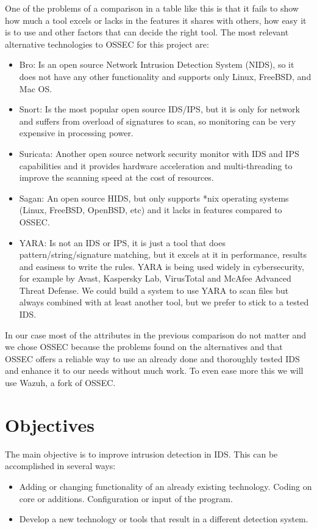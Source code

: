 \linej
\linej
One of the problems of a comparison in a table like this is that it fails to show how much a tool excels or lacks in the features it shares with others, how easy it is to use and other factors that can decide the right tool. The most relevant alternative technologies to OSSEC for this project are\cite{comparison_tools}:
\begin{itemize}
	\item Bro: Is an open source Network Intrusion Detection System (NIDS), so it does not have any other functionality and supports only Linux, FreeBSD, and Mac OS.
	\item Snort: Is the most popular open source IDS/IPS, but it is only for network and suffers from overload of signatures to scan, so monitoring can be very expensive in processing power.
	\item Suricata: Another open source network security monitor with IDS and IPS capabilities and it provides hardware acceleration and multi-threading to improve the scanning speed at the cost of resources.
	\item Sagan: An open source HIDS, but only supports *nix operating systems (Linux, FreeBSD, OpenBSD, etc) and it lacks in features compared to OSSEC.
	\item YARA: Is not an IDS or IPS, it is just a tool that does pattern/string/signature matching, but it excels at it in performance, results and easiness to write the rules. YARA is being used widely in cybersecurity, for example by Avast, Kaspersky Lab, VirusTotal and McAfee Advanced Threat Defense\cite{who_is_using_yara}. We could build a system to use YARA to scan files but always combined with at least another tool, but we prefer to stick to a tested IDS.
\end{itemize}
\linej
In our case most of the attributes in the previous comparison do not matter and we chose OSSEC because the problems found on the alternatives and that OSSEC offers a reliable way to use an already done and thoroughly tested IDS and enhance it to our needs without much work. To even ease more this we will use Wazuh, a fork of OSSEC.





\section{Objectives}
The main objective is to improve intrusion detection in IDS. This can be accomplished in several ways:
\begin{itemize}
	\item Adding or changing functionality of an already existing technology.
		\subitem Coding on core or additions.
		\subitem Configuration or input of the program.
	\item Develop a new technology or tools that result in a different detection system.
\end{itemize}

